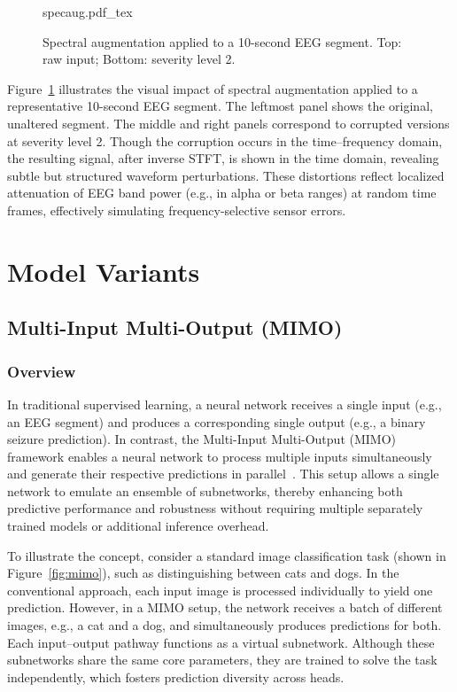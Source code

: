 \begin{figure}[h]
	\centering
    \def\svgwidth{220pt}
 	{specaug.pdf_tex} 	 	
	\caption[Spectral augmentation applied to a 10-second EEG segment]{Spectral augmentation applied to a 10-second EEG segment. Top: raw input; Bottom: severity level 2.}
	\label{fig:specaug}
\end{figure}

Figure~\ref{fig:specaug} illustrates the visual impact of spectral augmentation applied to a representative 10-second EEG segment. The leftmost panel shows the original, unaltered segment. The middle and right panels correspond to corrupted versions at severity level 2. Though the corruption occurs in the time–frequency domain, the resulting signal, after inverse STFT, is shown in the time domain, revealing subtle but structured waveform perturbations. These distortions reflect localized attenuation of EEG band power (e.g., in alpha or beta ranges) at random time frames, effectively simulating frequency-selective sensor errors.

\section{Model Variants}
\subsection{Multi-Input Multi-Output (MIMO)}

\subsubsection{Overview}
In traditional supervised learning, a neural network receives a single input (e.g., an EEG segment) and produces a corresponding single output (e.g., a binary seizure prediction). In contrast, the Multi-Input Multi-Output (MIMO) framework enables a neural network to process multiple inputs simultaneously and generate their respective predictions in parallel~\cite{mimofoundation}. This setup allows a single network to emulate an ensemble of subnetworks, thereby enhancing both predictive performance and robustness without requiring multiple separately trained models or additional inference overhead.

To illustrate the concept, consider a standard image classification task (shown in Figure~\ref{fig:mimo}), such as distinguishing between cats and dogs. In the conventional approach, each input image is processed individually to yield one prediction. However, in a MIMO setup, the network receives a batch of different images, e.g., a cat and a dog, and simultaneously produces predictions for both. Each input–output pathway functions as a virtual subnetwork. Although these subnetworks share the same core parameters, they are trained to solve the task independently, which fosters prediction diversity across heads.

